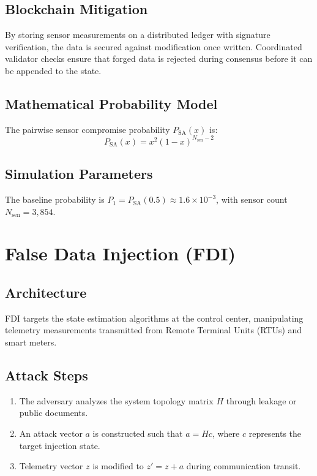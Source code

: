 \documentclass[12pt, oneside, a4paper]{report}
\theoremstyle{definition}
\theoremstyle{remark}
\newcommand{\Psa}{P_{\mathrm{SA}}}
\begin{document}
\subsection{Blockchain Mitigation}
By storing sensor measurements on a distributed ledger with signature verification, the data is secured against modification once written. Coordinated validator checks ensure that forged data is rejected during consensus before it can be appended to the state.

\subsection{Mathematical Probability Model}
The pairwise sensor compromise probability $\Psa(x)$ is:
\begin{equation}
\Psa(x) = x^2 (1 - x)^{N_{\mathrm{sen}} - 2}
\end{equation}

\subsection{Simulation Parameters}
The baseline probability is $P_1 = \Psa(0.5) \approx 1.6 \times 10^{-3}$, with sensor count $N_{\mathrm{sen}} = 3{,}854$.

\bigskip

\section{False Data Injection (FDI)}
\label{sec:tm:fdi}

\subsection{Architecture}
FDI targets the state estimation algorithms at the control center, manipulating telemetry measurements transmitted from Remote Terminal Units (RTUs) and smart meters.

\subsection{Attack Steps}
\begin{enumerate}
  \item The adversary analyzes the system topology matrix $H$ through leakage or public documents.
  \item An attack vector $a$ is constructed such that $a = H c$, where $c$ represents the target injection state.
  \item Telemetry vector $z$ is modified to $z' = z + a$ during communication transit.
\end{enumerate}
\end{document}
